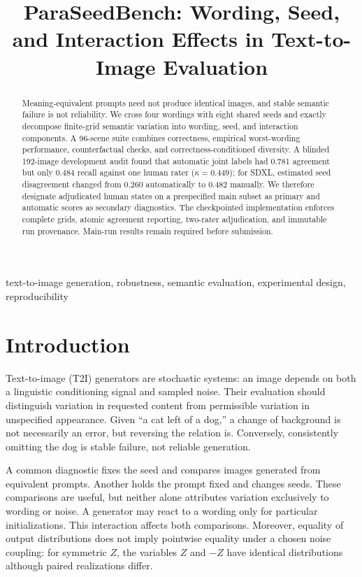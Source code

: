 \documentclass[10pt,letterpaper]{article}
\title{ParaSeedBench: Wording, Seed, and Interaction Effects in Text-to-Image Evaluation}
\begin{document}
\maketitle
\begin{abstract}
Meaning-equivalent prompts need not produce identical images, and stable semantic failure is not reliability. We cross four wordings with eight shared seeds and exactly decompose finite-grid semantic variation into wording, seed, and interaction components. A 96-scene suite combines correctness, empirical worst-wording performance, counterfactual checks, and correctness-conditioned diversity. A blinded 192-image development audit found that automatic joint labels had 0.781 agreement but only 0.484 recall against one human rater ($\kappa=0.449$); for SDXL, estimated seed disagreement changed from 0.260 automatically to 0.482 manually. We therefore designate adjudicated human states on a prespecified main subset as primary and automatic scores as secondary diagnostics. The checkpointed implementation enforces complete grids, atomic agreement reporting, two-rater adjudication, and immutable run provenance. Main-run results remain required before submission.
\end{abstract}
\begin{keywords}
text-to-image generation, robustness, semantic evaluation, experimental design, reproducibility
\end{keywords}

\section{Introduction}
Text-to-image (T2I) generators are stochastic systems: an image depends on both a linguistic conditioning signal and sampled noise. Their evaluation should distinguish variation in requested content from permissible variation in unspecified appearance. Given ``a cat left of a dog,'' a change of background is not necessarily an error, but reversing the relation is. Conversely, consistently omitting the dog is stable failure, not reliable generation.

A common diagnostic fixes the seed and compares images generated from equivalent prompts. Another holds the prompt fixed and changes seeds. These comparisons are useful, but neither alone attributes variation exclusively to wording or noise. A generator may react to a wording only for particular initializations. This interaction affects both comparisons. Moreover, equality of output distributions does not imply pointwise equality under a chosen noise coupling: for symmetric $Z$, the variables $Z$ and $-Z$ have identical distributions although paired realizations differ.
\end{document}
